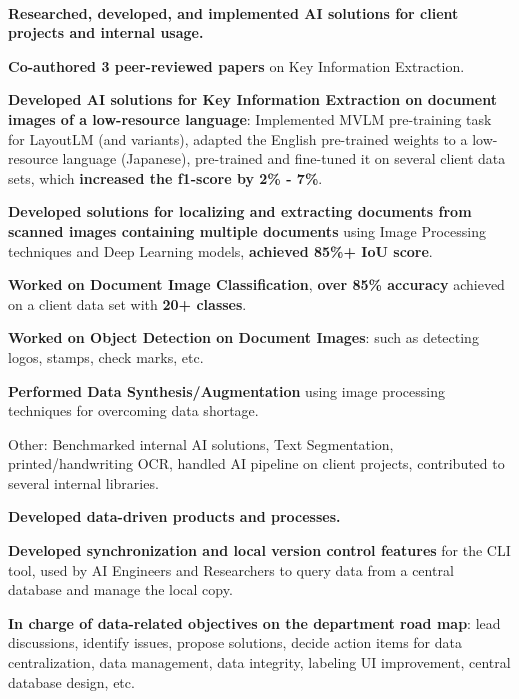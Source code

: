 \\
\begin{xitemize}
    \item \textbf{Researched, developed, and implemented AI solutions for client projects and internal usage.}
    \begin{zitemize}
        \item \textbf{Co-authored 3 peer-reviewed papers} on Key Information Extraction.
        \item \textbf{Developed AI solutions for Key Information Extraction on document images of a low-resource language}: Implemented MVLM pre-training task for LayoutLM (and variants), adapted the English pre-trained weights to a low-resource language (Japanese), pre-trained and fine-tuned it on several client data sets, which \textbf{increased the f1-score by 2\%  - 7\%}.
        \item \textbf{Developed solutions for localizing and extracting documents from scanned images containing multiple documents} using Image Processing techniques and Deep Learning models,  \textbf{achieved 85\%+ IoU score}.
        \item \textbf{Worked on Document Image Classification}, \textbf{over 85\% accuracy} achieved on a client data set with \textbf{20+ classes}.
        \item \textbf{Worked on Object Detection on Document Images}: such as detecting logos, stamps, check marks, etc.
        \item \textbf{Performed Data Synthesis/Augmentation} using image processing techniques for overcoming data shortage.
        \item Other: Benchmarked internal AI solutions, Text Segmentation, printed/handwriting OCR, handled AI pipeline on client projects, contributed to several internal libraries.
    \end{zitemize}
    \item \textbf{Developed data-driven products and processes.}
    \begin{zitemize}
        \item \textbf{Developed synchronization and local version control features} for the CLI tool, used by AI Engineers and Researchers to query data from a central database and manage the local copy.
        \item \textbf{In charge of data-related objectives on the department road map}: lead discussions, identify issues, propose solutions, decide action items for data centralization, data management, data integrity, labeling UI improvement, central database design, etc.

\end{zitemize}
\end{xitemize}
